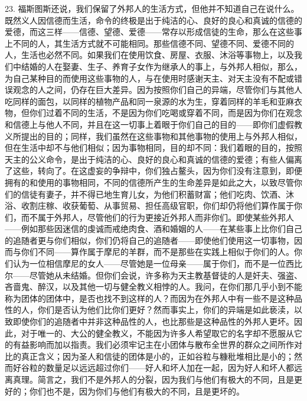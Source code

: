 23. 福斯图斯还说，我们保留了外邦人的生活方式，但他并不知道自己在说什么。既然义人因信德而生活，命令的终极是出于纯洁的心、良好的良心和真诚的信德的爱德，而这三样——信德、望德、爱德——常存以形成信徒的生命，那么在这些事上不同的人，其生活方式就不可能相同。那些信德不同、望德不同、爱德不同的人，生活也必然不同。如果我们在使用饮食、房屋、衣服、沐浴等事物上，以及我们中结婚的人在娶妻、生子、养育子女作为继承人的事上，与外邦人相似，那么，为自己某种目的而使用这些事物的人，与在使用时感谢天主、对天主没有不配或错误观念的人之间，仍存在巨大差异。因为按照你们自己的异端，尽管你们与其他人吃同样的面包，以同样的植物产品和同一泉源的水为生，穿着同样的羊毛和亚麻衣物，但你们过着不同的生活，不是因为你们吃喝或穿着不同，而是因为你们在观念和信德上与他人不同，并且在这一切事上着眼于你们自己的目的——即你们虚假教义所提出的目的；同样，我们虽然在这些事物和其他事物的使用上与外邦人相似，但在生活中却不与他们相似；因为事物相同，目的却不同：我们着眼的目的，按照天主的公义命令，是出于纯洁的心、良好的良心和真诚的信德的爱德；有些人偏离了这些，转向了。在这虚妄的争辩中，你们独占鳌头，因为你们没有注意到，即便拥有的和使用的事物相同，不同的信德所产生的生命差异是如此之大，以致尽管你们的信徒有妻子，并不得已地生育儿女，为他们积蓄财富；他们吃肉、饮酒、沐浴、收割庄稼、收获葡萄、从事贸易、担任高级官职，你们却仍将他们算作属于你们，而不属于外邦人，尽管他们的行为更接近外邦人而非你们。即使某些外邦人——例如那些因迷信的虔诚而戒绝肉食、酒和婚姻的人——在某些事上比你们自己的追随者更与你们相似，你们仍将自己的追随者——即使他们使用这一切事物，因而与你们不同——算作属于摩尼的羊群，而不是那些在实践上相似于你们的人。你们认为一位相信摩尼的女人——尽管她是一位母亲——属于你们，而不是一位西比尔——尽管她从未结婚。但你们会说，许多称为天主教基督徒的人是奸夫、强盗、吝啬鬼、醉汉，以及其他一切与健全教义相悖的人。我问，在你们那几乎小到不能称为团体的团体中，是否也找不到这样的人？而因为在外邦人中有一些不是这种品性的人，你们是否认为他们比你们更好？然而事实上，你们的异端是如此亵渎，以致即使你们的追随者中并非这种品性的人，也比那些是这种品性的外邦人更坏。因此，对于唯一的、大公的健全教义，不能因为许多人希望取它的名字却不愿服从它的有益影响而加以指责。我们必须牢记主在小团体与散布全世界的群众之间所作对比的真正含义；因为圣人和信徒的团体是小的，正如谷粒与糠秕堆相比是小的；然而好谷粒的数量足以远远超过你们——好人和坏人加在一起，因为好人和坏人都远离真理。简言之，我们不是外邦人的分裂，因为我们与他们有极大的不同，且是更好的；你们也不是，因为你们与他们有极大的不同，且是更坏的。\par


